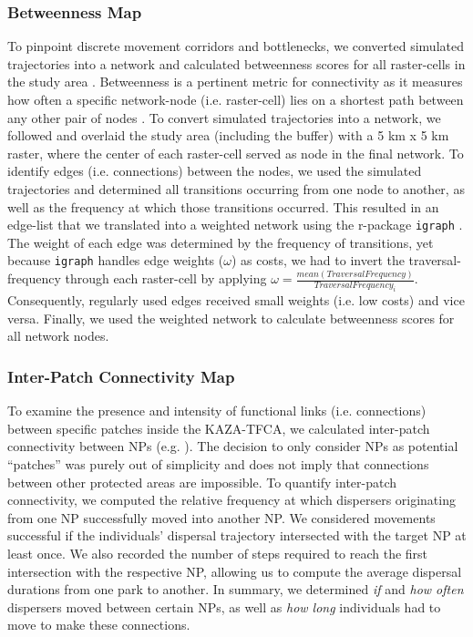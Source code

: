 \documentclass[abstract=on,10pt,a4paper,bibliography=totocnumbered]{article}
\begin{document}
\subsubsection{Betweenness Map}
To pinpoint discrete movement corridors and bottlenecks, we converted simulated
trajectories into a network and calculated betweenness scores for all
raster-cells in the study area \citep{BastilleRousseau.2018}. Betweenness is a
pertinent metric for connectivity as it measures how often a specific
network-node (i.e. raster-cell) lies on a shortest path between any other pair
of nodes \citep{BastilleRousseau.2018}. To convert simulated trajectories into a
network, we followed \citep{BastilleRousseau.2018} and overlaid the study area
(including the buffer) with a 5 km x 5 km raster, where the center of each
raster-cell served as node in the final network. To identify edges (i.e.
connections) between the nodes, we used the simulated trajectories and
determined all transitions occurring from one node to another, as well as the
frequency at which those transitions occurred. This resulted in an edge-list
that we translated into a weighted network using the r-package {\tt igraph}
\citep{Gabor.2006}. The weight of each edge was determined by the frequency of
transitions, yet because {\tt igraph} handles edge weights (\(\omega\)) as
costs, we had to invert the traversal-frequency through each raster-cell by
applying \(\omega = \frac{mean(Traversal Frequency)}{Traversal Frequency_i}\).
Consequently, regularly used edges received small weights (i.e. low costs) and
vice versa. Finally, we used the weighted network to calculate betweenness
scores for all network nodes.

\subsubsection{Inter-Patch Connectivity Map}
To examine the presence and intensity of functional links (i.e. connections)
between specific patches inside the KAZA-TFCA, we calculated inter-patch
connectivity between NPs (e.g. \citep{Gustafson.1996, Kanagaraj.2013}). The
decision to only consider NPs as potential ``patches'' was purely out of
simplicity and does not imply that connections between other protected areas are
impossible. To quantify inter-patch connectivity, we computed the relative
frequency at which dispersers originating from one NP successfully moved into
another NP. We considered movements successful if the individuals' dispersal
trajectory intersected with the target NP at least once. We also recorded the
number of steps required to reach the first intersection with the respective NP,
allowing us to compute the average dispersal durations from one park to another.
In summary, we determined \textit{if} and \textit{how often} dispersers moved
between certain NPs, as well as \textit{how long} individuals had to move to
make these connections.
\end{document}

